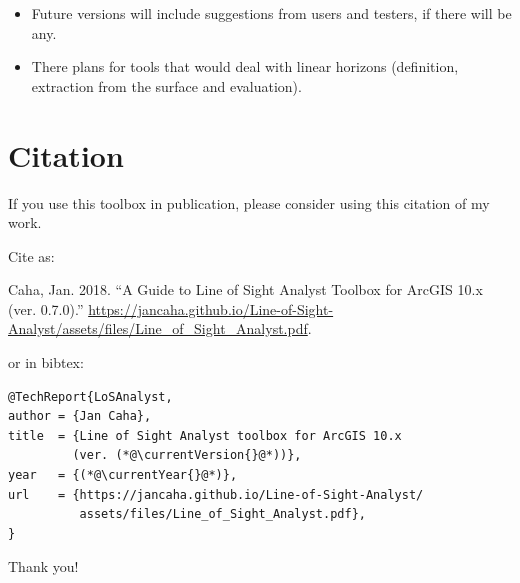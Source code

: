 \documentclass[]{article}
\newcommand{\currentVersion}{0.7.0}
\newcommand{\currentYear}{2018}
\begin{document}
\begin{itemize}
	\item Future versions will include suggestions from users and testers, if there will be any.
	\item There plans for tools that would deal with linear horizons (definition, extraction from the surface and evaluation).
\end{itemize}

\section{Citation}

If you use this toolbox in publication, please consider using this citation of my work. 
\vspace{1em}

\noindent Cite as:
\vspace{1em}

\noindent Caha, Jan. \currentYear{}. “A Guide to Line of Sight Analyst Toolbox for ArcGIS 10.x (ver. \currentVersion{}).”  \url{https://jancaha.github.io/Line-of-Sight-Analyst/assets/files/Line\_of\_Sight\_Analyst.pdf}.
\vspace{1em}

\noindent or in bibtex:
\vspace{1em}
\begin{lstlisting}
@TechReport{LoSAnalyst,
author = {Jan Caha},
title  = {Line of Sight Analyst toolbox for ArcGIS 10.x
         (ver. (*@\currentVersion{}@*))},
year   = {(*@\currentYear{}@*)},
url    = {https://jancaha.github.io/Line-of-Sight-Analyst/
          assets/files/Line_of_Sight_Analyst.pdf},
}
\end{lstlisting}

\vspace{1em}

\noindent Thank you!


\end{document}
